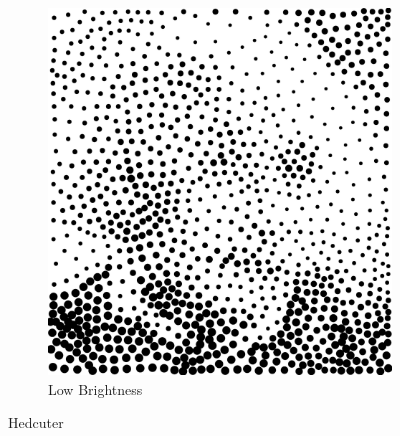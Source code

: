\documentclass[11pt]{article}
\begin{document}
\begin{enumerate}
\begin{figure}[H]
\begin{subfigure}{0.4\textwidth}
        \includegraphics[width=\textwidth]{../results/hedcuter/3-4.pdf}
         \caption{Low Brightness}
    \end{subfigure}
    \label{fig:1}
        \caption{Hedcuter}
\end{figure}


\end{enumerate}
\end{document}
